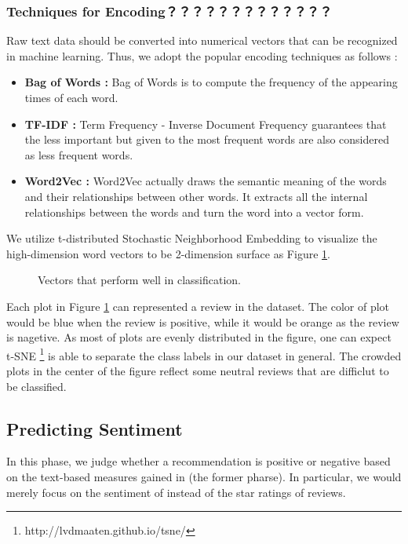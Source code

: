 \documentclass[12pt]{article}%
\begin{document}
\subsubsection{Techniques for Encoding？？？？？？？？？？？？？}
	
    Raw text data should be converted into numerical vectors that can be recognized in machine learning. Thus, we adopt the popular encoding techniques as follows :

\begin{itemize} 
	\item  \textbf{Bag of Words \cite{BOW, BOW2}:} Bag of Words is to compute the frequency of the appearing times of each word. 
	\item  \textbf{TF-IDF \cite{TF} :} Term Frequency - Inverse Document Frequency guarantees that the less important but given to the most frequent words are also considered as less frequent words.
	
	\item  \textbf{Word2Vec \cite{word,word2,word3}:} Word2Vec actually draws the semantic meaning of the words and their relationships between other words. It extracts all the internal relationships between the words and turn the word into a vector form.

\end{itemize}
We utilize t-distributed Stochastic Neighborhood Embedding\cite{t} to visualize the high-dimension word vectors to be 2-dimension surface as Figure \ref{fig}.
\begin{figure}[H]
	\centering
	\caption{ Vectors that perform well in classification.}
	\label{fig}
\end{figure}

Each plot in Figure \ref{fig} can represented a review in the dataset. The color of plot would be blue when the review is positive, while it would be orange as the review is nagetive. As most of plots are evenly distributed in the figure, one can expect t-SNE \footnote{\quad http://lvdmaaten.github.io/tsne/} is able to separate the class labels in our dataset in general. The crowded plots in the center of the figure reflect some neutral reviews that are difficlut to be classified.

\subsection{Predicting Sentiment}
In this phase, we judge whether a recommendation is positive or negative based on the text-based measures gained in (the former pharse). In particular, we would merely focus on the sentiment of instead of the star ratings of reviews. 
\end{document}
